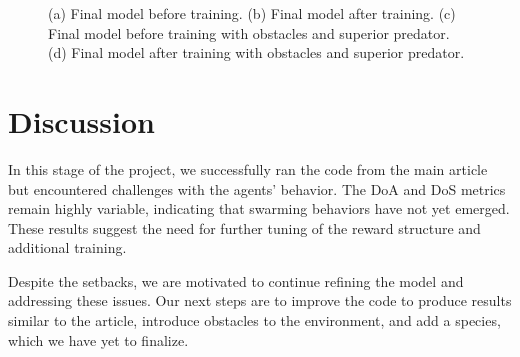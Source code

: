 \documentclass[9pt]{pnas-new}
\begin{document}
\begin{figure}[ht]
		\caption{(a) Final model before training. (b) Final model after training. (c) Final model before training with obstacles and superior predator. (d) Final model after training with obstacles and superior predator. }
		\label{fig:final}
	\end{figure}
	
	
	\section*{Discussion}
	In this stage of the project, we successfully ran the code from the main article but encountered challenges with the agents' behavior. 
	The DoA and DoS metrics remain highly variable, indicating that swarming behaviors have not yet emerged. 
	These results suggest the need for further tuning of the reward structure and additional training.
	
	Despite the setbacks, we are motivated to continue refining the model and addressing these issues. 
	Our next steps are to improve the code to produce results similar to the article, introduce obstacles to the environment, and add a species, which we have yet to finalize.
	
	\showacknow %
	
	
	\begin{multicols}{2}
	\end{multicols}
	
	
\end{document}
